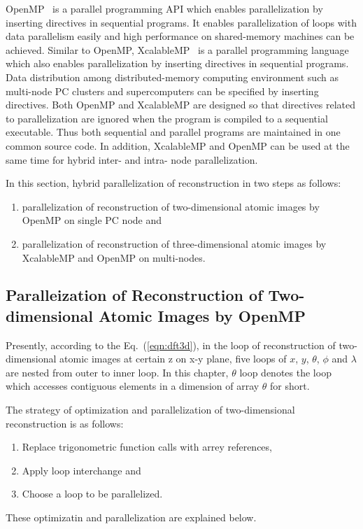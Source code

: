 \documentclass[graybox,vecphys]{svmult}
\begin{document}
OpenMP~\cite{OpenMP5} is a parallel programming API which enables
parallelization by inserting directives in sequential programs.  It
enables parallelization of loops with data parallelism easily and high
performance on shared-memory machines can be achieved. Similar to
OpenMP, XcalableMP~\cite{XcalableMP1_4} is a parallel programming language
which also enables parallelization by inserting directives in
sequential programs. Data distribution among distributed-memory
computing environment such as multi-node PC clusters and
supercomputers can be specified by inserting directives. Both OpenMP and
XcalableMP are designed so that directives related to parallelization
are ignored when the program is compiled to a sequential
executable. Thus both sequential and parallel programs are maintained
in one common source code. In addition, XcalableMP and OpenMP can be
used at the same time for hybrid inter- and intra- node
parallelization.

In this section, hybrid parallelization of reconstruction in two
steps as follows:
\begin{enumerate}
\item parallelization of reconstruction of two-dimensional atomic images
  by OpenMP on single PC node and
\item parallelization of reconstruction of three-dimensional atomic images
  by XcalableMP and OpenMP on multi-nodes.
\end{enumerate}

\subsection{Paralleization of Reconstruction of Two-dimensional Atomic Images by OpenMP}\label{sec:two_d_para}
Presently, according to the Eq.~(\ref{eqn:dft3d}), in the loop of
reconstruction of two-dimensional atomic images at certain z on x-y
plane, five loops of $x$, $y$, $\theta$, $\phi$ and $\lambda$ are nested
from outer to inner loop. In this chapter, $\theta$ loop denotes
the loop which accesses contiguous elements in a dimension of array $\theta$
for short.

The strategy of optimization and parallelization of two-dimensional
reconstruction is as follows:
\begin{enumerate}
\item Replace trigonometric function calls with arrey references,
\item Apply loop interchange and
\item Choose a loop to be parallelized.
\end{enumerate}
These optimizatin and parallelization are explained below.
\end{document}
